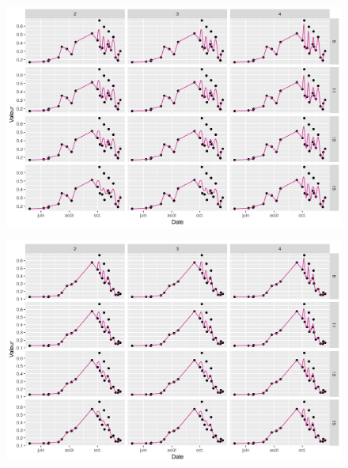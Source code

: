 \begin{figure}[htbp]
 \begin{center}
  \includegraphics[scale=0.7]{annexes/savgol_prs_1.png} 
 \end{center}
\end{figure}

\begin{figure}[htbp]
 \begin{center}
  \includegraphics[scale=0.7]{annexes/savgol_prs_2.png} 
 \end{center}
\end{figure}

